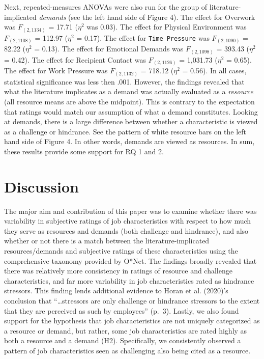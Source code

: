 \documentclass[
  man,mask]{apa6}
\begin{document}
Next, repeated-measures ANOVAs were also run for the group of literature-implicated \emph{demands} (see the left hand side of Figure 4). The effect for Overwork was \(F_{(2, 1134)}\) = 17.71 (\(\eta^2\) was 0.03). The effect for Physical Environment was \(F_{(2, 1108)}\) = 112.97 (\(\eta^2\) = 0.17). The effect for \texttt{Time\ Pressure} was \(F_{(2, 1090)}\) = 82.22 (\(\eta^2\) = 0.13). The effect for Emotional Demands was \(F_{(2, 1098)}\) = 393.43 (\(\eta^2\) = 0.42).
The effect for Recipient Contact was \(F_{(2, 1126)}\) = 1,031.73 (\(\eta^2\) = 0.65). The effect for Work Pressure was \(F_{(2, 1132)}\) = 718.12 (\(\eta^2\) = 0.56). In all cases, statistical significance was less then .001. However, the findings revealed that what the literature implicates as a demand was actually evaluated as a \emph{resource} (all resource means are above the midpoint). This is contrary to the expectation that ratings would match our assumption of what a demand constitutes. Looking at demands, there is a large difference between whether a characteristic is viewed as a challenge or hindrance. See the pattern of white resource bars on the left hand side of Figure 4. In other words, demands are viewed as resources. In sum, these results provide some support for RQ 1 and 2.

\hypertarget{discussion}{%
\section{Discussion}\label{discussion}}

The major aim and contribution of this paper was to examine whether there was variability in subjective ratings of job characteristics with respect to how much they serve as resources and demands (both challenge and hindrance), and also whether or not there is a match between the literature-implicated resources/demands and subjective ratings of these characteristics using the comprehensive taxonomy provided by O*Net. The findings broadly revealed that there was relatively more consistency in ratings of resource and challenge characteristics, and far more variability in job characteristics rated as hindrance stressors. This finding lends additional evidence to Horan et al. (2020)'s conclusion that ``\ldots stressors are only challenge or hindrance stressors to the extent that they are perceived as such by employees'' (p.~3). Lastly, we also found support for the hypothesis that job characteristics are not uniquely categorized as a resource or demand, but rather, some job characteristics are rated highly as both a resource and a demand (H2). Specifically, we consistently observed a pattern of job characteristics seen as challenging also being cited as a resource.
\end{document}

